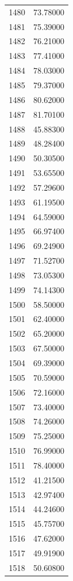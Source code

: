 \documentclass[
  letterpaper,
  DIV=11,
  numbers=noendperiod]{scrreprt}
\begin{document}
\begin{tcolorbox}
\begin{tabular}{lr}
1480 &         73.78000 \\
1481 &         75.39000 \\
1482 &         76.21000 \\
1483 &         77.41000 \\
1484 &         78.03000 \\
1485 &         79.37000 \\
1486 &         80.62000 \\
1487 &         81.70100 \\
1488 &         45.88300 \\
1489 &         48.28400 \\
1490 &         50.30500 \\
1491 &         53.65500 \\
1492 &         57.29600 \\
1493 &         61.19500 \\
1494 &         64.59000 \\
1495 &         66.97400 \\
1496 &         69.24900 \\
1497 &         71.52700 \\
1498 &         73.05300 \\
1499 &         74.14300 \\
1500 &         58.50000 \\
1501 &         62.40000 \\
1502 &         65.20000 \\
1503 &         67.50000 \\
1504 &         69.39000 \\
1505 &         70.59000 \\
1506 &         72.16000 \\
1507 &         73.40000 \\
1508 &         74.26000 \\
1509 &         75.25000 \\
1510 &         76.99000 \\
1511 &         78.40000 \\
1512 &         41.21500 \\
1513 &         42.97400 \\
1514 &         44.24600 \\
1515 &         45.75700 \\
1516 &         47.62000 \\
1517 &         49.91900 \\
1518 &         50.60800 \\

\end{tabular}
\end{tcolorbox}
\end{document}
